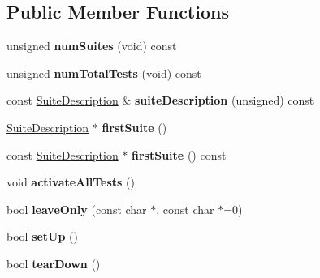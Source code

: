 \subsection*{Public Member Functions}
\begin{DoxyCompactItemize}
\item 
\hypertarget{classCxxTest_1_1DummyWorldDescription_a67c8732d9f7af8fba6bfa6af8a50b9b1}{unsigned {\bfseries num\-Suites} (void) const }\label{classCxxTest_1_1DummyWorldDescription_a67c8732d9f7af8fba6bfa6af8a50b9b1}

\item 
\hypertarget{classCxxTest_1_1DummyWorldDescription_a8c22ad8a1322910c12efde300af6ff10}{unsigned {\bfseries num\-Total\-Tests} (void) const }\label{classCxxTest_1_1DummyWorldDescription_a8c22ad8a1322910c12efde300af6ff10}

\item 
\hypertarget{classCxxTest_1_1DummyWorldDescription_a6ac8a1dc038fc842a6393200ed9788de}{const \hyperlink{classCxxTest_1_1SuiteDescription}{Suite\-Description} \& {\bfseries suite\-Description} (unsigned) const }\label{classCxxTest_1_1DummyWorldDescription_a6ac8a1dc038fc842a6393200ed9788de}

\item 
\hypertarget{classCxxTest_1_1DummyWorldDescription_a5898cb8664cf9cdc8ad488d8f7c4faa0}{\hyperlink{classCxxTest_1_1SuiteDescription}{Suite\-Description} $\ast$ {\bfseries first\-Suite} ()}\label{classCxxTest_1_1DummyWorldDescription_a5898cb8664cf9cdc8ad488d8f7c4faa0}

\item 
\hypertarget{classCxxTest_1_1DummyWorldDescription_a0c36115f9bbe671e3b4bc381a6b96671}{const \hyperlink{classCxxTest_1_1SuiteDescription}{Suite\-Description} $\ast$ {\bfseries first\-Suite} () const }\label{classCxxTest_1_1DummyWorldDescription_a0c36115f9bbe671e3b4bc381a6b96671}

\item 
\hypertarget{classCxxTest_1_1DummyWorldDescription_ac0c6f072e9d1d1027c6a6ed3226f4419}{void {\bfseries activate\-All\-Tests} ()}\label{classCxxTest_1_1DummyWorldDescription_ac0c6f072e9d1d1027c6a6ed3226f4419}

\item 
\hypertarget{classCxxTest_1_1DummyWorldDescription_ae063a241c98995268b3df7be8362ff52}{bool {\bfseries leave\-Only} (const char $\ast$, const char $\ast$=0)}\label{classCxxTest_1_1DummyWorldDescription_ae063a241c98995268b3df7be8362ff52}

\item 
\hypertarget{classCxxTest_1_1DummyWorldDescription_a17bf1593f3627dded7f69d71c8172172}{bool {\bfseries set\-Up} ()}\label{classCxxTest_1_1DummyWorldDescription_a17bf1593f3627dded7f69d71c8172172}

\item 
\hypertarget{classCxxTest_1_1DummyWorldDescription_aeac2bd6926e9ce72df8f04bb8c432d5c}{bool {\bfseries tear\-Down} ()}\label{classCxxTest_1_1DummyWorldDescription_aeac2bd6926e9ce72df8f04bb8c432d5c}

\end{DoxyCompactItemize}
